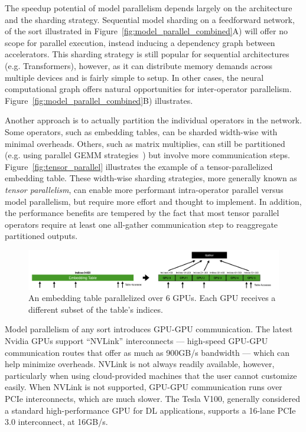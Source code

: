 The speedup potential of model parallelism depends largely on the architecture and the sharding strategy. Sequential model sharding on a feedforward network, of the sort illustrated in Figure~\ref{fig:model_parallel_combined}A) will offer no scope for parallel execution, instead inducing a dependency graph between accelerators. This sharding strategy is still popular for sequential architectures (e.g. Transformers), however, as it can distribute memory demands across multiple devices and is fairly simple to setup. In other cases, the neural computational graph offers natural opportunities for inter-operator parallelism. Figure~\ref{fig:model_parallel_combined}B) illustrates.

Another approach is to actually partition the individual operators in the network. Some operators, such as embedding tables, can be sharded width-wise with minimal overheads. Others, such as matrix multiplies, can still be partitioned (e.g. using parallel GEMM strategies~\cite{BLIS1}) but involve more communication steps. Figure~\ref{fig:tensor_parallel} illustrates the example of a tensor-parallelized embedding table. These width-wise sharding strategies, more generally known as \textit{tensor parallelism}, can enable more performant intra-operator parallel versus model parallelism, but require more effort and thought to implement. In addition, the performance benefits are tempered by the fact that most tensor parallel operators require at least one all-gather communication step to reaggregate partitioned outputs.



\begin{figure}[th!]
\centering
	\includegraphics[keepaspectratio=true, width=0.9\linewidth]{images/embedding_table_parallel}
	\caption{An embedding table parallelized over 6 GPUs. Each GPU receives a different subset of the table's indices.}
	\label{fig:embedding_table_parallel}
\end{figure}

Model parallelism of any sort introduces GPU-GPU communication. The latest Nvidia GPUs support ``NVLink'' interconnects --- high-speed GPU-GPU communication routes that offer as much as 900GB/s bandwidth --- which can help minimize overheads. NVLink is not always readily available, however, particularly when using cloud-provided machines that the user cannot customize easily. When NVLink is not supported, GPU-GPU communication runs over PCIe interconnects, which are much slower. The Tesla V100, generally considered a standard high-performance GPU for DL applications, supports a 16-lane PCIe 3.0 interconnect, at 16GB/s. 

